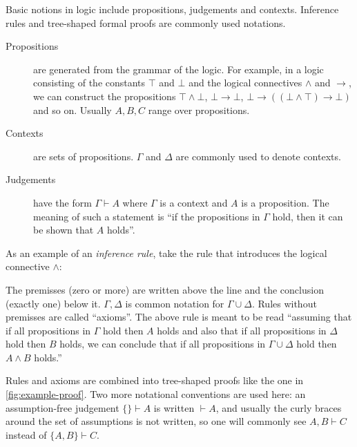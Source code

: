 \documentclass[12pt,toc=bibliography,numbers=noendperiod,
               footnotes=multiple,twoside]{scrartcl}
\begin{document}

Basic notions in logic include propositions, judgements and contexts. Inference rules and tree-shaped formal proofs are commonly used notations.

\begin{description}
\item[Propositions] are generated from the grammar of the logic. For example, in a logic consisting of the constants \(\top\) and \(\bot\) and the logical connectives \(\wedge\) and \(\rightarrow\), we can construct the propositions \(\top \wedge \bot\), \(\bot \rightarrow \bot\), \(\bot \rightarrow ((\bot \wedge \top) \rightarrow \bot)\) and so on. Usually \(A, B, C\) range over propositions.
\item[Contexts] are sets of propositions. \(\Gamma\) and \(\Delta\) are commonly used to denote contexts.
\item[Judgements] have the form \(\Gamma \vdash A\) where \(\Gamma\) is a context and \(A\) is a proposition. The meaning of such a statement is \enquote{if the propositions in \(\Gamma\) hold, then it can be shown that \(A\) holds}.
\end{description}

As an example of an \emph{inference rule}, take the rule that introduces the logical connective \(\wedge\):

\begin{figure}[h]
\begin{prooftree}
\end{prooftree}
\end{figure}

The premisses (zero or more) are written above the line and the conclusion (exactly one) below it. \(\Gamma,\Delta\) is common notation for \(\Gamma \cup \Delta\). Rules without premisses are called \enquote{axioms}. The above rule is meant to be read \enquote{assuming that if all propositions in \(\Gamma\) hold then \(A\) holds and also that if all propositions in \(\Delta\) hold then \(B\) holds, we can conclude that if all propositions in \(\Gamma \cup \Delta\) hold then \(A \wedge B\) holds.}

Rules and axioms are combined into tree-shaped proofs like the one in \cref{fig:example-proof}. Two more notational conventions are used here: an assumption-free judgement \(\{\} \vdash A\) is written \(\vdash A\), and usually the curly braces around the set of assumptions is not written, so one will commonly see \(A,B \vdash C\) instead of \(\{A,B\} \vdash C\).
\end{document}
